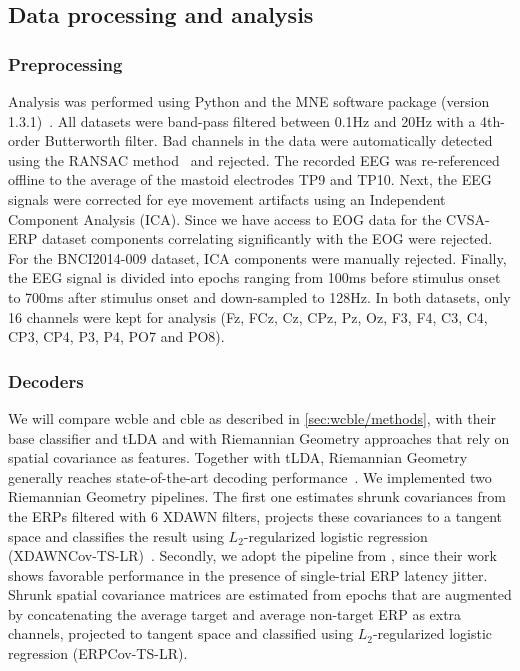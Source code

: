 \subsection{Data processing and analysis}
\subsubsection{Preprocessing}
Analysis was performed using Python and the MNE software package (version
1.3.1)~\cite{Gramfort2013}.
All datasets were band-pass filtered between 0.1Hz and 20Hz with a 4th-order Butterworth filter.
Bad channels in the data were automatically detected using the RANSAC
method~\cite{Fischler1981} and rejected.
The recorded EEG was re-referenced
offline to the average of the mastoid electrodes TP9 and TP10.
Next, the EEG signals were corrected for eye movement artifacts using an
Independent Component Analysis (ICA).
Since we have access to EOG data for the CVSA-ERP dataset components correlating
significantly with the EOG were rejected.
For the BNCI2014-009 dataset, ICA components were manually rejected.
Finally, the EEG signal is divided into epochs ranging from 100ms before stimulus onset to 700ms after stimulus onset and down-sampled to 128Hz.
In both datasets, only 16 channels were kept for
analysis (Fz, FCz, Cz, CPz, Pz, Oz, F3, F4, C3, C4, CP3, CP4, P3, P4, PO7 and
PO8).

\subsubsection{Decoders}
\label{sec:covert-align/methods/decoders}
We will compare \ac{wcble} and \ac{cble} as described in
\autoref{sec:wcble/methods}, with their base classifier and tLDA and with
Riemannian Geometry
approaches that rely on spatial covariance as features.
Together with tLDA, Riemannian Geometry generally reaches state-of-the-art decoding
performance~\cite{Lotte2018}.
We implemented two Riemannian Geometry pipelines.
The first one estimates shrunk covariances from the ERPs filtered with 6 XDAWN
filters, projects these covariances to a tangent space and classifies the
result using $L_2$-regularized logistic regression
(XDAWNCov-TS-LR)~\cite{Cecotti2017}.
Secondly, we adopt the pipeline from \cite{Aydarkhanov2020}, since their work shows
favorable performance in the presence of single-trial ERP latency jitter.
Shrunk spatial covariance matrices are estimated from epochs that are
augmented by concatenating the average target and average non-target ERP as
extra channels, projected to tangent space and classified using
$L_2$-regularized logistic regression (ERPCov-TS-LR).

